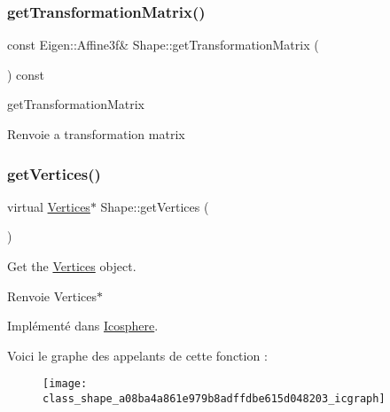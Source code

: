 \subsubsection{\texorpdfstring{get\+Transformation\+Matrix()}{getTransformationMatrix()}}
{\footnotesize\ttfamily const Eigen\+::\+Affine3f\& Shape\+::get\+Transformation\+Matrix (\begin{DoxyParamCaption}{ }\end{DoxyParamCaption}) const\hspace{0.3cm}{\ttfamily [inline]}}



get\+Transformation\+Matrix 

\begin{DoxyReturn}{Renvoie}
a transformation matrix 
\end{DoxyReturn}
\mbox{\label{class_shape_a08ba4a861e979b8adffdbe615d048203}} 
\subsubsection{\texorpdfstring{get\+Vertices()}{getVertices()}\hspace{0.1cm}{\footnotesize\ttfamily [1/2]}}
{\footnotesize\ttfamily virtual \hyperlink{struct_shape_1_1_vertices}{Vertices}$\ast$ Shape\+::get\+Vertices (\begin{DoxyParamCaption}{ }\end{DoxyParamCaption})\hspace{0.3cm}{\ttfamily [pure virtual]}}



Get the \hyperlink{struct_shape_1_1_vertices}{Vertices} object. 

\begin{DoxyReturn}{Renvoie}
Vertices$\ast$ 
\end{DoxyReturn}


Implémenté dans \hyperlink{class_icosphere_aae0a9d0e0cff48ca120bd401e2cb14f4}{Icosphere}.

Voici le graphe des appelants de cette fonction \+:\nopagebreak
\begin{figure}[H]
\begin{center}
\leavevmode
\texttt{[image: class\_shape\_a08ba4a861e979b8adffdbe615d048203\_icgraph]}
\end{center}
\end{figure}
\mbox{\label{class_shape_ac40943613d4b7480d305d807abeb01e0}} 
